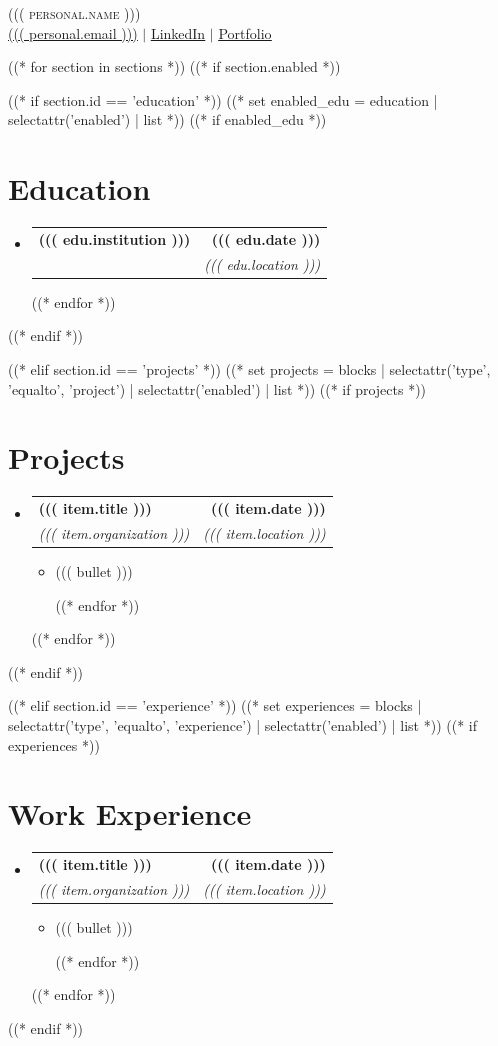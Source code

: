 \documentclass[a4paper,11pt]{article}
\makeatletter
\newcommand{\resumeItem}[1]{
  \item\small{
    {#1 \vspace{-2pt}}
  }
}
\newcommand{\resumeSubheading}[4]{
  \vspace{-2pt}\item
    \begin{tabular*}{1.0\textwidth}[t]{l@{\extracolsep{\fill}}r}
      \textbf{#1} & \textbf{\small #2} \\
      \textit{\small#3} & \textit{\small #4} \\
    \end{tabular*}\vspace{-7pt}
}
\newcommand{\resumeSubHeadingListStart}{\begin{itemize}[leftmargin=0.0in, label={}]}
\newcommand{\resumeSubHeadingListEnd}{\end{itemize}}
\newcommand{\resumeItemListStart}{\begin{itemize}}
\newcommand{\resumeItemListEnd}{\end{itemize}\vspace{-5pt}}
\makeatother
\begin{document}
\begin{center}
    {\Huge \scshape ((( personal.name )))} \\ \vspace{1pt}
    \small \href{mailto:((( personal.email )))}{\underline{((( personal.email )))}} $|$ 
    \href{https://linkedin.com/in/((( personal.linkedin )))}{\underline{LinkedIn}} $|$
    \href{((( personal.portfolio )))}{\underline{Portfolio}}
    \vspace{-8pt}
\end{center}

((* for section in sections *))
((* if section.enabled *))

((* if section.id == 'education' *))
((* set enabled_edu = education | selectattr('enabled') | list *))
((* if enabled_edu *))
\section{Education}
  \resumeSubHeadingListStart
((* for edu in enabled_edu *))
    \resumeSubheading
      {((( edu.institution )))}{((( edu.date )))}
      {\parbox[t]{0.8\textwidth}{%
        ((( edu.degree ))), GPA - ((( edu.gpa ))) \\
        \small{\textbf{Coursework:} ((( edu.coursework )))}
      }}{((( edu.location )))}
((* endfor *))
  \resumeSubHeadingListEnd
((* endif *))

((* elif section.id == 'projects' *))
((* set projects = blocks | selectattr('type', 'equalto', 'project') | selectattr('enabled') | list *))
((* if projects *))
\section{Projects}
  \resumeSubHeadingListStart
((* for item in projects *))
  \resumeSubheading
  {((( item.title )))}{((( item.date )))}
  {((( item.organization )))}{((( item.location )))}
  \resumeItemListStart
((* for bullet in item.description *))
    \resumeItem{((( bullet )))}
((* endfor *))
  \resumeItemListEnd
((* endfor *))
  \resumeSubHeadingListEnd
\vspace{-16pt}
((* endif *))

((* elif section.id == 'experience' *))
((* set experiences = blocks | selectattr('type', 'equalto', 'experience') | selectattr('enabled') | list *))
((* if experiences *))
\section{Work Experience}
  \resumeSubHeadingListStart
((* for item in experiences *))
  \resumeSubheading
  {((( item.title )))}{((( item.date )))}
  {((( item.organization )))}{((( item.location )))}
  \resumeItemListStart
((* for bullet in item.description *))
    \resumeItem{((( bullet )))}
((* endfor *))
  \resumeItemListEnd
((* endfor *))
  \resumeSubHeadingListEnd
\vspace{-16pt}
((* endif *))
\end{document}
